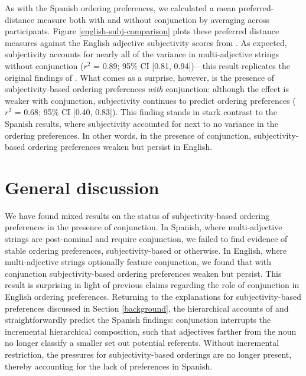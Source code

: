 \documentclass[12pt,letterpaper]{article}
\begin{document}
As with the Spanish ordering preferences, we calculated a mean preferred-distance measure both with and without conjunction by averaging across participants. Figure \ref{english-subj-comparison} plots these preferred distance measures against the English adjective subjectivity scores from \cite{scontrasetal2017adjectives}. As expected, subjectivity accounts for nearly all of the variance in multi-adjective strings without conjunction ($r^2$ = 0.89; 95\% CI [0.81, 0.94])---this result replicates the original findings of \cite{scontrasetal2017adjectives}. What comes as a surprise, however, is the presence of subjectivity-based ordering preferences \emph{with} conjunction: although the effect is weaker with conjunction, subjectivity continues to predict ordering preferences ($r^2$ = 0.68; 95\% CI [0.40, 0.83]). This finding stands in stark contrast to the Spanish results, where subjectivity accounted for next to no variance in the ordering preferences. In other words, in the presence of conjunction, subjectivity-based ordering preferences weaken but persist in English.




\section{General discussion} \label{discussion}

We have found mixed results on the status of subjectivity-based ordering preferences in the presence of conjunction. In Spanish, where multi-adjective strings are post-nominal and require conjunction, we failed to find evidence of stable ordering preferences, subjectivity-based or otherwise. In English, where multi-adjective strings optionally feature conjunction, we found that with conjunction subjectivity-based ordering preferences weaken but persist. This result is surprising in light of previous claims regarding the role of conjunction in English ordering preferences. Returning to the explanations for subjectivity-based preferences discussed in Section \ref{background}, the hierarchical accounts of \cite{simonic2018} and \cite{scontrasetalSPadjectives} straightforwardly predict the Spanish findings: conjunction interrupts the incremental hierarchical composition, such that adjectives farther from the noun no longer classify a smaller set out potential referents. Without incremental restriction, the pressures for subjectivity-based orderings are no longer present, thereby accounting for the lack of preferences in Spanish.
\end{document}
